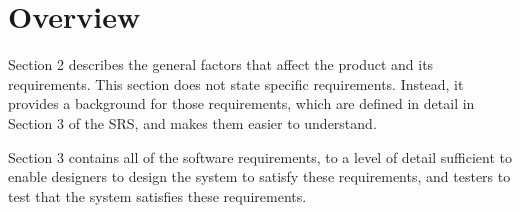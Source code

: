 \section{Overview}

	Section 2 describes the general factors that affect the product and 
	its requirements. This section does not state specific requirements. Instead, it provides a 
	background for those requirements, which are defined in detail in Section 
	3 of the SRS, and makes them easier to understand.
	
	Section 3 contains all of the software requirements, to a level of detail 
	sufficient to enable designers to design the system to satisfy these 
	requirements, and testers to test that the system satisfies these
	requirements.
